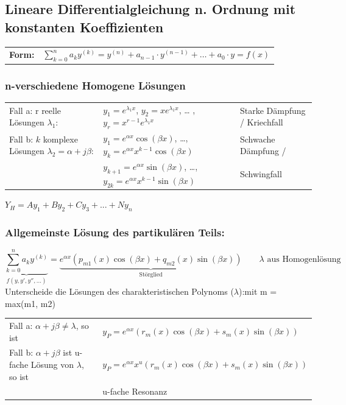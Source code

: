 \subsection{Lineare Differentialgleichung n. Ordnung mit konstanten Koeffizienten }
\begin{tabular}{p{1.5cm}p{8cm}}
\textbf{Form:} &
$\sum\limits_{k=0}^na_ky^{(k)}= y^{(n)}+a_{n-1}\cdot y^{(n-1)}+\ldots +a_0\cdot y=f(x)$\\
\end{tabular}

\subsubsection{n-verschiedene Homogene Lösungen}
\begin{tabular}{lll}
Fall a: r reelle Lösungen $\lambda_1$: 
	& $y_1=e^{\lambda_1x}$, $y_2=xe^{\lambda_1x}$, \ldots
	,$y_r=x^{r-1}e^{\lambda_1x}$ 
	& Starke Dämpfung / Kriechfall\\
Fall b: $k$ komplexe Lösungen $\lambda_2=\alpha +j\beta$: 
	&$y_1=e^{\alpha x}\cos(\beta x)$, \ldots, $y_k=e^{\alpha x}x^{k-1}\cos(\beta
x)$
	& Schwache Dämpfung /\\
	&$y_{k+1}=e^{\alpha x}\sin(\beta x)$, \ldots, $y_{2k}=e^{\alpha
x}x^{k-1}\sin(\beta x)$
	& Schwingfall\\
\end{tabular}
$Y_H = Ay_1 + By_2 + Cy_3 + ... + Ny_n$
\newpage
\subsubsection{Allgemeinste Lösung des partikulären Teils:}
$$\underbrace{\sum_{k=0}^n a_k y^{(k)}}_{f(y,y',y'',\ldots)} = \underbrace{e^{\alpha x} (p_{m1}(x) \cos (\beta x) + q_{m2}(x) \sin (\beta x))}_{\text{Störglied}} \qquad \lambda \text{ aus Homogenlösung}$$
Unterscheide die Lösungen des charakteristischen Polynoms ($\lambda$):\hspace{5.5cm}mit m = max(m1, m2)\\
\begin{tabular}{p{8cm}p{8.5cm}}
Fall a: $\alpha + j\beta \neq \lambda$, so ist &
$y_P = e^{\alpha x}(r_m(x)\cos(\beta x) + s_m(x) \sin(\beta x))$\\
Fall b: $\alpha + j\beta$  ist u-fache Lösung von $\lambda$, so ist &
$y_P = e^{\alpha x} x^u (r_m(x) \cos(\beta x) + s_m(x) \sin(\beta x))$\\
&
u-fache Resonanz

\end{tabular}

